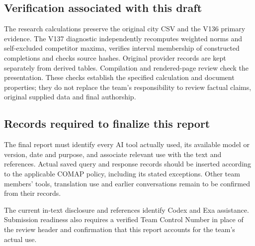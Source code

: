 \subsection*{Verification associated with this draft}
The research calculations preserve the original city CSV and the V136 primary
evidence. The V137 diagnostic independently recomputes weighted norms and
self-excluded competitor maxima, verifies interval membership of constructed
completions and checks source hashes. Original provider records are kept
separately from derived tables. Compilation and rendered-page review check the
presentation. These checks establish the specified calculation and document
properties; they do not replace the team's responsibility to review factual
claims, original supplied data and final authorship.

\subsection*{Records required to finalize this report}
The final report must identify every AI tool actually used, its available
model or version, date and purpose, and associate relevant use with the text
and references. Actual saved query and response records should be inserted
according to the applicable COMAP policy, including its stated exceptions.
Other team members' tools, translation use and earlier conversations remain
to be confirmed from their records.

The current in-text disclosure and references identify Codex and Exa
assistance. Submission readiness also requires a verified Team Control Number
in place of the review header and confirmation that this report accounts for
the team's actual use.
